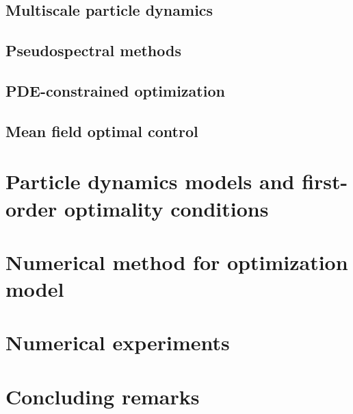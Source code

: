 \documentclass[final]{siamltex}
\begin{document}
\subsection{Multiscale particle dynamics}\label{sec:Background_MPS}




\subsection{Pseudospectral methods}\label{sec:Background_Pseudospectral}




\subsection{PDE-constrained optimization}\label{sec:Background_PDECO}



\subsection{Mean field optimal control}\label{sec:Background_MFGOC}



\section{Particle dynamics models and first-order optimality conditions}\label{sec:Optimality}




\section{Numerical method for optimization model}\label{sec:Method}




\section{Numerical experiments}\label{sec:Expts}


\section{Concluding remarks}\label{sec:Conc}
\end{document}
